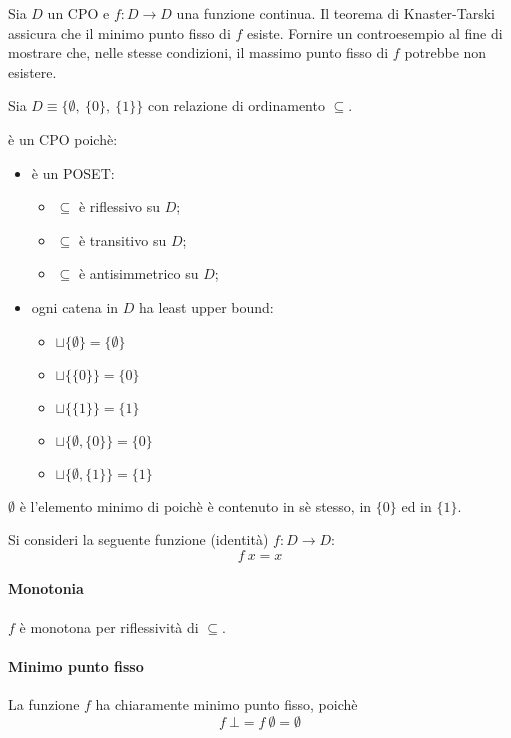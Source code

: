 \newcommand{\lt}{\ensuremath{\sqsubseteq}}

{
  Sia $D$ un CPO e $f: D \to D$ una funzione continua. Il teorema di
  Knaster-Tarski assicura che il minimo punto fisso di $f$ esiste.
  Fornire un controesempio al fine di mostrare che, nelle stesse condizioni, il
  massimo punto fisso di $f$ potrebbe non esistere.
}
{
}

Sia $D \equiv \{\emptyset,\ \{0\},\ \{1\}\}$ con relazione di ordinamento
$\subseteq$.

 è un CPO poichè:
\begin{itemize}
  \item {} è un POSET:
  \begin{itemize}
    \item $\subseteq$ è riflessivo su $D$;
    \item $\subseteq$ è transitivo su $D$;
    \item $\subseteq$ è antisimmetrico su $D$;
  \end{itemize}
  \item ogni catena in $D$ ha least upper bound:
  \begin{itemize}
    \item $\sqcup\{\emptyset\} = \{\emptyset\}$
    \item $\sqcup\{\{0\}\} = \{0\}$
    \item $\sqcup\{\{1\}\} = \{1\}$
    \item $\sqcup\{\emptyset, \{0\}\} = \{0\}$
    \item $\sqcup\{\emptyset, \{1\}\} = \{1\}$
  \end{itemize}
\end{itemize}

$\emptyset$ è l'elemento minimo di  poichè
è contenuto in sè stesso, in $\{0\}$ ed in $\{1\}$.

Si consideri la seguente funzione (identità) $f: D \to D$:
$$
f\ x = x
$$

\paragraph{Monotonia} $f$ è monotona per riflessività di $\subseteq$.

\paragraph{Minimo punto fisso}
La funzione $f$ ha chiaramente minimo punto fisso, poichè
$$
f\ \bot = f\ \emptyset = \emptyset
$$

